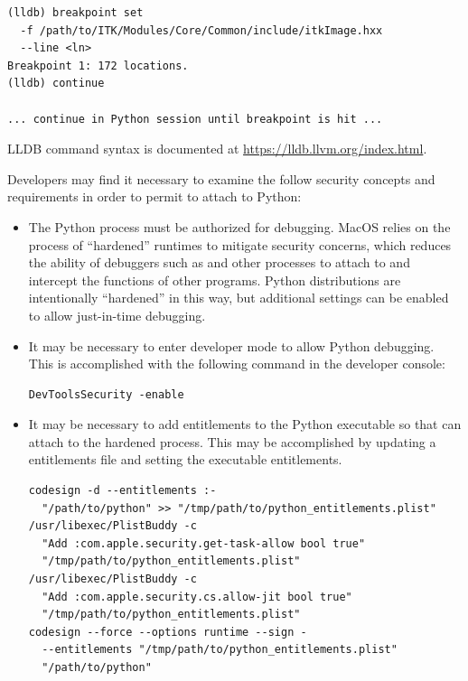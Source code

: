 \begin{enumerate}
\begin{itemize}
\begin{verbatim}
(lldb) breakpoint set
  -f /path/to/ITK/Modules/Core/Common/include/itkImage.hxx
  --line <ln>
Breakpoint 1: 172 locations.
(lldb) continue

... continue in Python session until breakpoint is hit ...
\end{verbatim}

LLDB command syntax is documented at \url{https://lldb.llvm.org/index.html}.

Developers may find it necessary to examine the follow security concepts
and requirements in order to permit  to attach to Python:

\begin{itemize}

\item The Python process must be authorized for debugging. MacOS relies on the
process of \enquote{hardened} runtimes to mitigate security concerns, which reduces
the ability of debuggers such as  and other processes to attach
to and intercept the functions of other programs. Python distributions
are intentionally \enquote{hardened} in this way, but additional settings can be
enabled to allow just-in-time debugging.

\item It may be necessary to enter developer mode to allow Python debugging.
This is accomplished with the following command in the developer console:

\begin{verbatim}
DevToolsSecurity -enable
\end{verbatim}

\item It may be necessary to add entitlements to the Python executable so that
 can attach to the hardened process. This may be accomplished by
updating a  entitlements file and setting the executable entitlements.

\begin{verbatim}
codesign -d --entitlements :-
  "/path/to/python" >> "/tmp/path/to/python_entitlements.plist"
/usr/libexec/PlistBuddy -c
  "Add :com.apple.security.get-task-allow bool true"
  "/tmp/path/to/python_entitlements.plist"
/usr/libexec/PlistBuddy -c
  "Add :com.apple.security.cs.allow-jit bool true"
  "/tmp/path/to/python_entitlements.plist"
codesign --force --options runtime --sign -
  --entitlements "/tmp/path/to/python_entitlements.plist"
  "/path/to/python"
\end{verbatim}


\end{itemize}
\end{itemize}
\end{enumerate}
